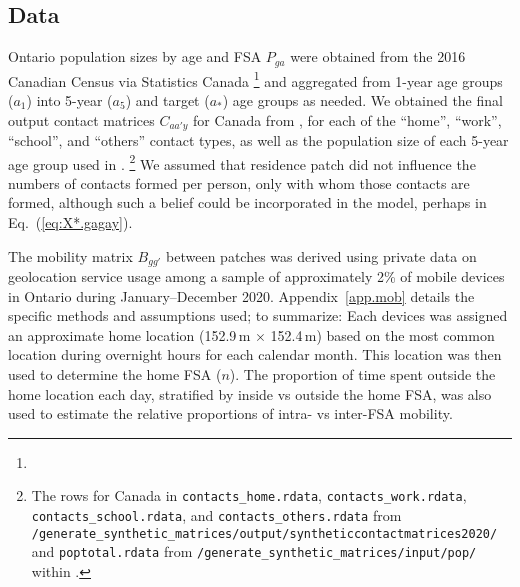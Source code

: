 \subsection{Data}\label{ex:data}
Ontario population sizes by age and FSA $P_{ga}$ were obtained from
the 2016 Canadian Census via Statistics Canada%
\footnote{}
and aggregated from 1-year age groups ($a_1$) into 5-year ($a_5$) and target ($a_*$) age groups as needed.
We obtained the final output contact matrices $C_{aa'y}$ for Canada from \cite{Prem2021},
for each of the ``home'', ``work'', ``school'', and ``others'' contact types,
as well as the population size of each 5-year age group used in \cite{Prem2021}.%
\footnote{\raggedright
  The rows for Canada in
  \texttt{contacts\_home.rdata},
  \texttt{contacts\_work.rdata},
  \texttt{contacts\_school.rdata}, and
  \texttt{contacts\_others.rdata}
  from \texttt{/generate\_synthetic\_matrices/output/syntheticcontactmatrices2020/} and
  \texttt{poptotal.rdata}
  from \texttt{/generate\_synthetic\_matrices/input/pop/}
  within .}
We assumed that residence patch did not influence the numbers of contacts formed per person,
only with whom those contacts are formed,
although such a belief could be incorporated in the model,
perhaps in Eq.~(\ref{eq:X*.gagay}).
\par
The mobility matrix $B_{gg'}$ between patches was derived using
private data on geolocation service usage among
a sample of approximately 2\% of mobile devices in Ontario \cite{Ghasemi2021}
during January--December 2020.
Appendix~\ref{app.mob} details the specific methods and assumptions used; to summarize:
Each devices was assigned an approximate home location (152.9\,m $\times$ 152.4\,m)
based on the most common location during overnight hours for each calendar month.
This location was then used to determine the home FSA ($n$).
The proportion of time spent outside the home location each day,
stratified by inside vs outside the home FSA,
was also used to estimate the relative proportions of intra- vs inter-FSA mobility.
